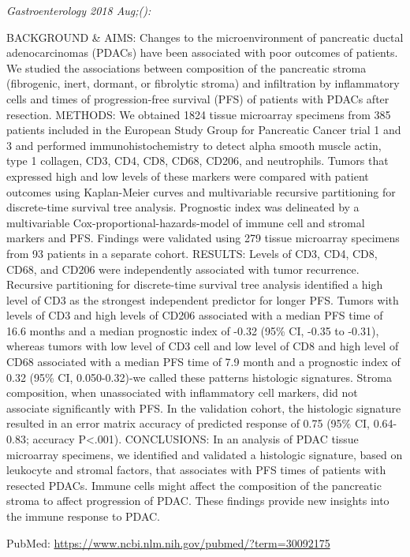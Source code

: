 \documentclass[]{article}
\begin{document}
\emph{Gastroenterology 2018 Aug;():}

BACKGROUND \& AIMS: Changes to the microenvironment of pancreatic ductal
adenocarcinomas (PDACs) have been associated with poor outcomes of
patients. We studied the associations between composition of the
pancreatic stroma (fibrogenic, inert, dormant, or fibrolytic stroma) and
infiltration by inflammatory cells and times of progression-free
survival (PFS) of patients with PDACs after resection. METHODS: We
obtained 1824 tissue microarray specimens from 385 patients included in
the European Study Group for Pancreatic Cancer trial 1 and 3 and
performed immunohistochemistry to detect alpha smooth muscle actin, type
1 collagen, CD3, CD4, CD8, CD68, CD206, and neutrophils. Tumors that
expressed high and low levels of these markers were compared with
patient outcomes using Kaplan-Meier curves and multivariable recursive
partitioning for discrete-time survival tree analysis. Prognostic index
was delineated by a multivariable Cox-proportional-hazards-model of
immune cell and stromal markers and PFS. Findings were validated using
279 tissue microarray specimens from 93 patients in a separate cohort.
RESULTS: Levels of CD3, CD4, CD8, CD68, and CD206 were independently
associated with tumor recurrence. Recursive partitioning for
discrete-time survival tree analysis identified a high level of CD3 as
the strongest independent predictor for longer PFS. Tumors with levels
of CD3 and high levels of CD206 associated with a median PFS time of
16.6 months and a median prognostic index of -0.32 (95\% CI, -0.35 to
-0.31), whereas tumors with low level of CD3 cell and low level of CD8
and high level of CD68 associated with a median PFS time of 7.9 month
and a prognostic index of 0.32 (95\% CI, 0.050-0.32)-we called these
patterns histologic signatures. Stroma composition, when unassociated
with inflammatory cell markers, did not associate significantly with
PFS. In the validation cohort, the histologic signature resulted in an
error matrix accuracy of predicted response of 0.75 (95\% CI, 0.64-0.83;
accuracy P\textless{}.001). CONCLUSIONS: In an analysis of PDAC tissue
microarray specimens, we identified and validated a histologic
signature, based on leukocyte and stromal factors, that associates with
PFS times of patients with resected PDACs. Immune cells might affect the
composition of the pancreatic stroma to affect progression of PDAC.
These findings provide new insights into the immune response to PDAC.

PubMed: \url{https://www.ncbi.nlm.nih.gov/pubmed/?term=30092175}
\end{document}

